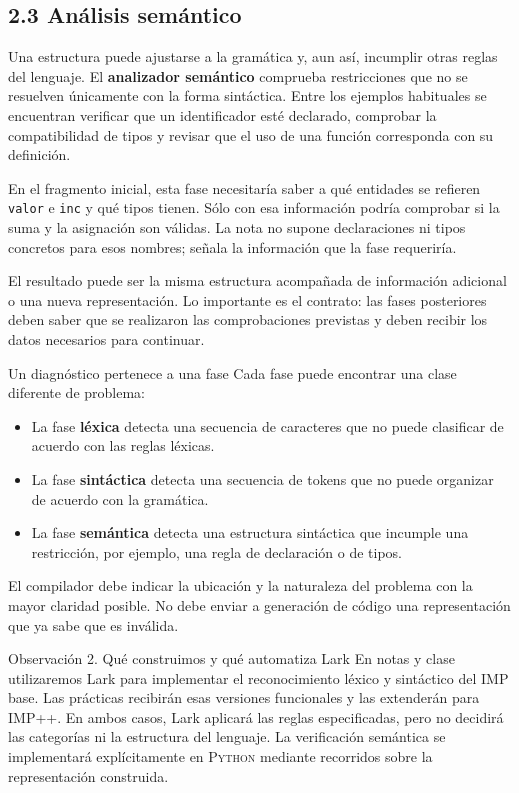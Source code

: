 \documentclass[11pt,spanish]{article}
\begin{document}
\subsection*{2.3 Análisis semántico}

Una estructura puede ajustarse a la gramática y, aun así, incumplir otras reglas del lenguaje. El \textbf{analizador semántico} comprueba restricciones que no se resuelven únicamente con la forma sintáctica. Entre los ejemplos habituales se encuentran verificar que un identificador esté declarado, comprobar la compatibilidad de tipos y revisar que el uso de una función corresponda con su definición.

En el fragmento inicial, esta fase necesitaría saber a qué entidades se refieren \texttt{valor} e \texttt{inc} y qué tipos tienen. Sólo con esa información podría comprobar si la suma y la asignación son válidas. La nota no supone declaraciones ni tipos concretos para esos nombres; señala la información que la fase requeriría.

El resultado puede ser la misma estructura acompañada de información adicional o una nueva representación. Lo importante es el contrato: las fases posteriores deben saber que se realizaron las comprobaciones previstas y deben recibir los datos necesarios para continuar.

\begin{ejemplo}{Un diagnóstico pertenece a una fase}
Cada fase puede encontrar una clase diferente de problema:

\begin{itemize}
    \item La fase \textbf{léxica} detecta una secuencia de caracteres que no puede clasificar de acuerdo con las reglas léxicas.
    \item La fase \textbf{sintáctica} detecta una secuencia de tokens que no puede organizar de acuerdo con la gramática.
    \item La fase \textbf{semántica} detecta una estructura sintáctica que incumple una restricción, por ejemplo, una regla de declaración o de tipos.
\end{itemize}

El compilador debe indicar la ubicación y la naturaleza del problema con la mayor claridad posible. No debe enviar a generación de código una representación que ya sabe que es inválida.
\end{ejemplo}

\begin{observacion}{Observación 2. Qué construimos y qué automatiza Lark}
En notas y clase utilizaremos Lark para implementar el reconocimiento léxico y sintáctico del \textsc{IMP} base. Las prácticas recibirán esas versiones funcionales y las extenderán para \textsc{IMP++}. En ambos casos, Lark aplicará las reglas especificadas, pero no decidirá las categorías ni la estructura del lenguaje. La verificación semántica se implementará explícitamente en \textsc{Python} mediante recorridos sobre la representación construida.
\end{observacion}
\end{document}

